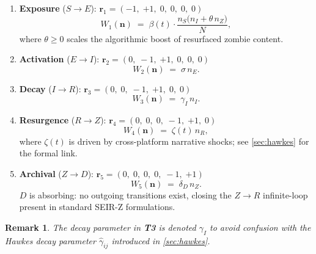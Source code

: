 \documentclass[11pt]{article}
\newtheorem{remark}{Remark}
\newcommand{\bn}{\mathbf{n}}
\newcommand{\br}{\mathbf{r}}
\begin{document}
\begin{enumerate}[label=\textbf{T\arabic*.}, leftmargin=*, noitemsep]

  \item \textbf{Exposure} ($S \to E$): \quad
        $\br_1 = (-1,\;{+1},\;0,\;0,\;0,\;0)$
        \begin{equation}
          W_1(\bn) \;=\; \beta(t)\cdot
          \frac{n_S\bigl(n_I + \theta\, n_Z\bigr)}{N},
          \label{eq:w1}
        \end{equation}
        where $\theta \ge 0$ scales the algorithmic boost of resurfaced zombie
        content.

  \item \textbf{Activation} ($E \to I$): \quad
        $\br_2 = (0,\;-1,\;{+1},\;0,\;0,\;0)$
        \begin{equation}
          W_2(\bn) \;=\; \sigma\, n_E.
          \label{eq:w2}
        \end{equation}

  \item \textbf{Decay} ($I \to R$): \quad
        $\br_3 = (0,\;0,\;-1,\;{+1},\;0,\;0)$
        \begin{equation}
          W_3(\bn) \;=\; \gamma_I\, n_I.
          \label{eq:w3}
        \end{equation}

  \item \textbf{Resurgence} ($R \to Z$): \quad
        $\br_4 = (0,\;0,\;0,\;-1,\;{+1},\;0)$
        \begin{equation}
          W_4(\bn) \;=\; \zeta(t)\, n_R,
          \label{eq:w4}
        \end{equation}
        where $\zeta(t)$ is driven by cross-platform narrative shocks;
        see \cref{sec:hawkes} for the formal link.

  \item \textbf{Archival} ($Z \to D$): \quad
        $\br_5 = (0,\;0,\;0,\;0,\;-1,\;{+1})$
        \begin{equation}
          W_5(\bn) \;=\; \delta_D\, n_Z.
          \label{eq:w5}
        \end{equation}
        $D$ is absorbing: no outgoing transitions exist, closing the
        $Z \to R$ infinite-loop present in standard SEIR-Z formulations.

\end{enumerate}

\begin{remark}
The decay parameter in \textbf{T3} is denoted $\gamma_I$ to avoid confusion with
the Hawkes decay parameter $\hat{\gamma}_{ij}$ introduced in \cref{sec:hawkes}.
\end{remark}
\end{document}
